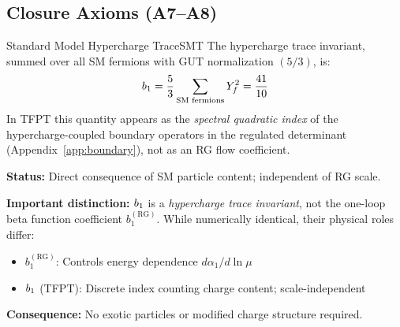 \subsection{Closure Axioms (A7--A8)}

\begin{axiom}{Standard Model Hypercharge Trace}{SMT}
The hypercharge trace invariant, summed over all SM fermions with GUT normalization 
$(5/3)$, is:
\begin{equation}
    b_1 = \frac{5}{3} \sum_{\text{SM fermions}} Y_f^2 = \frac{41}{10}
\end{equation}
In TFPT this quantity appears as the \emph{spectral quadratic index} of the
hypercharge-coupled boundary operators in the regulated determinant
(Appendix~\ref{app:boundary}), not as an RG flow coefficient.

\tcblower
\textbf{Status:} Direct consequence of SM particle content; independent of RG scale.

\textbf{Important distinction:} $b_1$ is a \emph{hypercharge trace invariant}, 
not the one-loop beta function coefficient $b_1^{(\text{RG})}$. While numerically 
identical, their physical roles differ:
\begin{itemize}[leftmargin=1.5em, topsep=2pt, itemsep=1pt]
    \item $b_1^{(\text{RG})}$: Controls energy dependence $d\alpha_1/d\ln\mu$
    \item $b_1$ (TFPT): Discrete index counting charge content; scale-independent
\end{itemize}

\textbf{Consequence:} No exotic particles or modified charge structure required.
\end{axiom}

